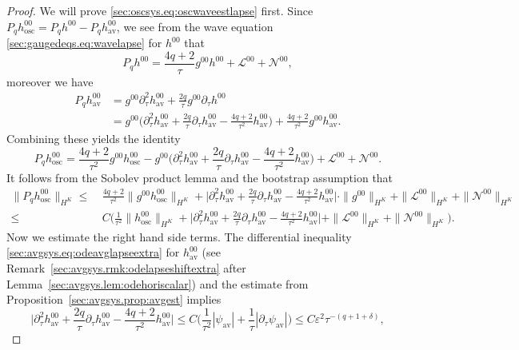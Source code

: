 \documentclass{article}
\newcommand{\osc}{\mathrm{osc}}
\newcommand{\av}{\mathrm{av}}
\newcommand{\mc}{\mathcal}
\newcommand{\ve}{\varepsilon}
\newcommand{\pa}{\partial}
\begin{document}
\begin{proof}
    We will prove \eqref{sec:oscsys.eq:oscwaveestlapse} first. Since $P_q h_{\osc}^{00} = P_q h^{00} - P_q h_{\av}^{00}$, we see from the wave equation \eqref{sec:gaugedeqs.eq:wavelapse} for $h^{00}$ that
    \begin{equation}
        P_q h^{00} = \frac{4q+2}{\tau}g^{00}h^{00} + \mc{L}^{00} + \mc{N}^{00},
    \end{equation}
    moreover we have
    \begin{align}
        P_q h_{\av}^{00} &= g^{00}\pa_\tau^2 h_{\av}^{00} + \frac{2q}{\tau}g^{00}\pa_\tau h^{00}\nonumber\\
        &= g^{00}\Big(\pa_\tau^2 h_{\av}^{00} + \frac{2q}{\tau}\pa_\tau h_{\av}^{00} - \frac{4q+2}{\tau^2}h_{\av}^{00}\Big) + \frac{4q+2}{\tau^2}g^{00}h_{\av}^{00}.
    \end{align}
    Combining these yields the identity
    \begin{equation}
        P_q h_{\osc}^{00} =  \frac{4q+2}{\tau^2}g^{00}h_{\osc}^{00} - g^{00}\Big(\pa_\tau^2 h_{\av}^{00} + \frac{2q}{\tau}\pa_\tau h_{\av}^{00} - \frac{4q+2}{\tau^2}h_{\av}^{00}\Big) + \mc{L}^{00} + \mc{N}^{00}.
    \end{equation}
    It follows from the Sobolev product lemma and the bootstrap assumption that
    \begin{align}
        \|P_q h_{\osc}^{00}\|_{H^K}
        \leq&\> \frac{4q+2}{\tau^2}\|g^{00}h_{\osc}^{00}\|_{H^K} + \Big|\pa_\tau^2 h_{\av}^{00} + \frac{2q}{\tau}\pa_\tau h_{\av}^{00} - \frac{4q+2}{\tau^2}h_{\av}^{00}\Big|\cdot\|g^{00}\|_{H^K}+\|\mc{L}^{00}\|_{H^K} + \|\mc{N}^{00}\|_{H^K}\nonumber\\
        \leq&\> C\Big(\frac{1}{\tau^2}\|h_{\osc}^{00}\|_{H^K} + \Big|\pa_\tau^2 h_{\av}^{00} + \frac{2q}{\tau}\pa_\tau h_{\av}^{00} - \frac{4q+2}{\tau^2}h_{\av}^{00}\Big| + \|\mc{L}^{00}\|_{H^K} +  \|\mc{N}^{00}\|_{H^K}\Big).
    \end{align}
    Now we estimate the right hand side terms. The differential inequality \eqref{sec:avgsys.eq:odeavglapseextra} for $h_{\av}^{00}$ (see  Remark~\ref{sec:avgsys.rmk:odelapseshiftextra} after Lemma~\ref{sec:avgsys.lem:odehoriscalar}) and the estimate from Proposition~\ref{sec:avgsys.prop:avgest} implies
    \begin{equation}
        \Big|\pa_\tau^2 h_{\av}^{00} + \frac{2q}{\tau}\pa_\tau h_{\av}^{00} - \frac{4q+2}{\tau^2}h_{\av}^{00}\Big| \leq C\Big(\frac{1}{\tau^2}|\psi_{\av}| + \frac{1}{\tau}|\pa_\tau \psi_{\av}|\Big) \leq C\ve^2\tau^{-(q+1+\delta)},

\end{equation}
\end{proof}
\end{document}

